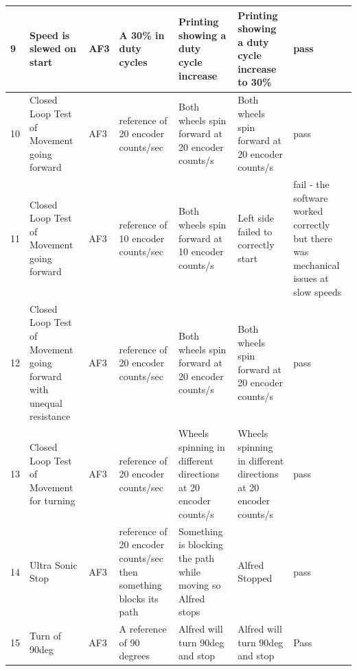 \documentclass [10pt]{article}
\begin{document}
\begin{longtable}{| p{} | p{} | p{} | p{} | p{} | p{} | p{} |}
		9 &  Speed is slewed on start &  AF3 &  A 30\% in duty cycles &  Printing showing a duty cycle increase &  Printing showing a duty cycle increase to 30\% &  pass\\ \hline
		10 &  Closed Loop Test of Movement going forward &  AF3 &  reference of 20 encoder counts/sec &  Both wheels spin forward at 20 encoder counts/s &  Both wheels spin forward at  20 encoder counts/s &   pass\\ \hline
		11 &  Closed Loop Test of Movement going forward &  AF3 &  reference of 10 encoder counts/sec &  Both wheels spin forward at  10 encoder counts/s &  Left side failed to correctly start &  fail - the software worked correctly but there was mechanical issues at slow speeds \\ \hline
		12 &  Closed Loop Test of Movement going forward with unequal resistance &  AF3 &  reference of 20 encoder counts/sec &  Both wheels spin forward at 20 encoder counts/s & Both wheels spin forward at  20 encoder counts/s &   pass
		\\ \hline
		13 &  Closed Loop Test of Movement for turning &  AF3 &  reference of 20 encoder counts/sec &  Wheels spinning in different directions at 20 encoder counts/s & Wheels spinning in different directions at 20 encoder counts/s &  pass 
		\\ \hline
		14 &  Ultra Sonic Stop &  AF3 &  reference of 20 encoder counts/sec then something blocks its path &  Something is blocking the path while moving so Alfred stops &  Alfred Stopped &  pass 
		\\ \hline

		15 &  Turn of 90deg &  AF3 &  A reference of 90 degrees &  Alfred will turn 90deg and stop &  Alfred will turn 90deg and stop &  Pass
		\\ \hline
	\end{longtable}
\end{document}

